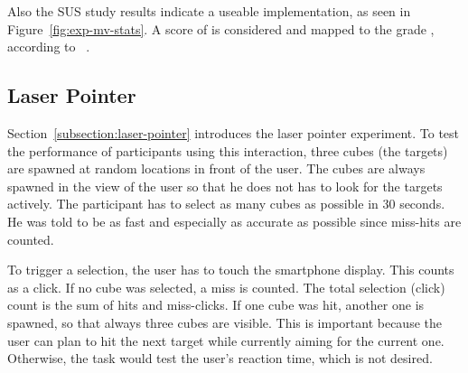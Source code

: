Also the \ac{SUS} study results indicate a useable implementation, as seen in Figure~\ref{fig:exp-mv-stats}. A score of \evalExpMvSusScore{} is considered \evalExpMvSusAdj{} and mapped to the grade \evalExpMvSusGrade, according to \citeauthor{Bangor.2009}~\cite[120\psq]{Bangor.2009}.



\subsection{Laser Pointer}\label{section:eval-res-lp}

Section~\ref{subsection:laser-pointer} introduces the laser pointer experiment. To test the performance of participants using this interaction, three cubes (the targets) are spawned at random locations in front of the user. The cubes are always spawned in the view of the user so that he does not has to look for the targets actively. The participant has to select as many cubes as possible in 30 seconds. He was told to be as fast and especially as accurate as possible since miss-hits are counted. 

To trigger a selection, the user has to touch the smartphone display. This counts as a click. If no cube was selected, a miss is counted. The total selection (click) count is the sum of hits and miss-clicks. If one cube was hit, another one is spawned, so that always three cubes are visible. This is important because the user can plan to hit the next target while currently aiming for the current one. Otherwise, the task would test the user's reaction time, which is not desired. 

